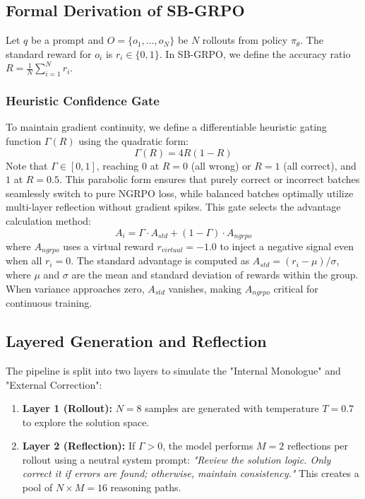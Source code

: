 \documentclass[runningheads]{llncs}
\begin{document}
\subsection{Formal Derivation of SB-GRPO}
Let $q$ be a prompt and $O = \{o_1, \dots, o_N\}$ be $N$ rollouts from policy $\pi_\theta$. The standard reward for $o_i$ is $r_i \in \{0, 1\}$. In SB-GRPO, we define the accuracy ratio $R = \frac{1}{N} \sum_{i=1}^N r_i$.

\subsubsection{Heuristic Confidence Gate}
To maintain gradient continuity, we define a differentiable heuristic gating function $\Gamma(R)$ using the quadratic form:
\begin{equation}
\Gamma(R) = 4R(1-R)
\end{equation}
Note that $\Gamma \in [0, 1]$, reaching $0$ at $R=0$ (all wrong) or $R=1$ (all correct), and $1$ at $R=0.5$. This parabolic form ensures that purely correct or incorrect batches seamlessly switch to pure NGRPO loss, while balanced batches optimally utilize multi-layer reflection without gradient spikes. This gate selects the advantage calculation method:
\begin{equation}
A_{i} = \Gamma \cdot A_{std} + (1-\Gamma) \cdot A_{ngrpo}
\end{equation}
where $A_{ngrpo}$ uses a virtual reward $r_{virtual} = -1.0$ to inject a negative signal even when all $r_i=0$. The standard advantage is computed as $A_{std} = (r_i - \mu) / \sigma$, where $\mu$ and $\sigma$ are the mean and standard deviation of rewards within the group. When variance approaches zero, $A_{std}$ vanishes, making $A_{ngrpo}$ critical for continuous training.

\subsection{Layered Generation and Reflection}
The pipeline is split into two layers to simulate the "Internal Monologue" and "External Correction":
\begin{enumerate}
    \item \textbf{Layer 1 (Rollout):} $N=8$ samples are generated with temperature $T=0.7$ to explore the solution space.
    \item \textbf{Layer 2 (Reflection):} If $\Gamma > 0$, the model performs $M=2$ reflections per rollout using a neutral system prompt: \textit{"Review the solution logic. Only correct it if errors are found; otherwise, maintain consistency."} This creates a pool of $N \times M = 16$ reasoning paths.
\end{enumerate}
\end{document}

